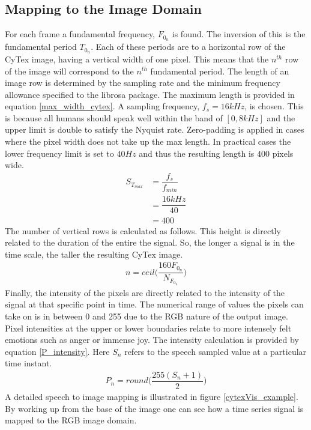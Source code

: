 \subsection{Mapping to the Image Domain}
For each frame a fundamental frequency, $F_{0_n}$ is found. The inversion of this is the fundamental period $T_{0_n}$. Each of these periods are to a horizontal row of the CyTex image, having a vertical width of one pixel. This means that the $n^{th}$ row of the image will correspond to the $n^{th}$ fundamental period. The length of an image row is determined by the sampling rate and the minimum frequency allowance specified to the librosa package. The maximum length is provided in equation \ref{max_width_cytex}.  A sampling frequency, $f_s = 16kHz$, is chosen. This is because all humans should speak well within the band of $[0, 8kHz]$ and the upper limit is double to satisfy the Nyquist rate. Zero-padding is applied in cases where the pixel width does not take up the max length. In practical cases the lower frequency limit is set to $40Hz$ and thus the resulting length is $400$ pixels wide.
\begin{align}\label{max_width_cytex}
    S_{T_{max}} &= \dfrac{f_s}{f_{min}} \\ \nonumber
                &= \dfrac{16kHz}{40} \\ \nonumber
                &= 400
\end{align}
 The number of vertical rows is calculated as follows. This height is directly related to the duration of the entire the signal. So, the longer a signal is in the time scale, the taller the resulting CyTex image. 
\begin{align}\label{vert_rows_eqn}
    n = ceil \Big( \dfrac{160 F_{0_n}}{N_{F_{0_n}}} \Big)
\end{align}
Finally, the intensity of the pixels are directly related to the intensity of the signal at that specific point in time. The numerical range of values the pixels can take on is in between 0 and 255 due to the RGB nature of the output image. Pixel intensities at the upper or lower boundaries relate to more intensely felt emotions such as anger or immense joy. The intensity calculation is provided by equation \ref{P_intensity}. Here $S_n$ refers to the speech sampled value at a particular time instant.
\begin{align}\label{P_intensity}
    P_n = round \Big( \dfrac{255 (S_n + 1)}{2} \Big)
\end{align}
A detailed speech to image mapping is illustrated in figure \ref{cytexVis_example}. By working up from the base of the image one can see how a time series signal is mapped to the RGB image domain. 
